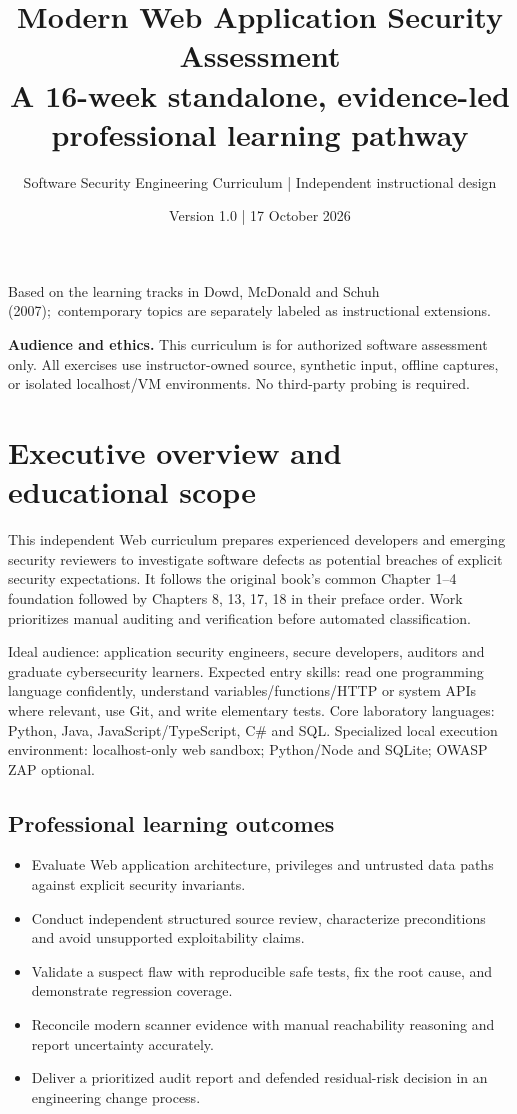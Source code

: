 \documentclass[10pt,letterpaper]{article}
\title{\vspace{-1.6cm}\Huge\color{navy}\bfseries Modern Web Application Security Assessment\\[8pt]\large\color{teal}A 16-week standalone, evidence-led professional learning pathway}
\author{Software Security Engineering Curriculum | Independent instructional design}
\date{Version 1.0 | 17 October 2026}
\begin{document}
\maketitle
\begin{center}\small Based on the learning tracks in Dowd, McDonald and Schuh (2007);\
contemporary topics are separately labeled as instructional extensions.\end{center}
\begin{insight}\textbf{Audience and ethics.} This curriculum is for authorized software assessment only. All exercises use instructor-owned source, synthetic input, offline captures, or isolated localhost/VM environments. No third-party probing is required.\end{insight}
\tableofcontents
\clearpage
\section{Executive overview and educational scope}
This independent Web curriculum prepares experienced developers and emerging security reviewers to investigate software defects as potential breaches of explicit security expectations. It follows the original book's common Chapter 1--4 foundation followed by Chapters 8, 13, 17, 18 in their preface order. Work prioritizes manual auditing and verification before automated classification.

Ideal audience: application security engineers, secure developers, auditors and graduate cybersecurity learners. Expected entry skills: read one programming language confidently, understand variables/functions/HTTP or system APIs where relevant, use Git, and write elementary tests. Core laboratory languages: Python, Java, JavaScript/TypeScript, C\# and SQL. Specialized local execution environment: localhost-only web sandbox; Python/Node and SQLite; OWASP ZAP optional.

\subsection{Professional learning outcomes}
\begin{itemize}[leftmargin=*,itemsep=2pt]
\item Evaluate Web application architecture, privileges and untrusted data paths against explicit security invariants.
\item Conduct independent structured source review, characterize preconditions and avoid unsupported exploitability claims.
\item Validate a suspect flaw with reproducible safe tests, fix the root cause, and demonstrate regression coverage.
\item Reconcile modern scanner evidence with manual reachability reasoning and report uncertainty accurately.
\item Deliver a prioritized audit report and defended residual-risk decision in an engineering change process.
\end{itemize}
\end{document}
